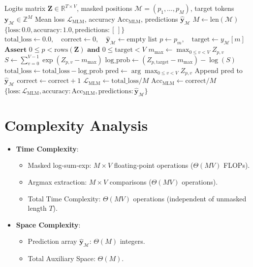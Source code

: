 \documentclass[11pt,a4paper]{article}
\theoremstyle{definition}
\begin{document}
\begin{algorithm}[H]
\caption{Masked Language Modeling Evaluation Pipeline}
\label{alg:mlm}
\begin{algorithmic}[1]
\Require Logits matrix $\mathbf{Z} \in \mathbb{R}^{T \times V}$, masked positions $\mathcal{M} = (p_1, \dots, p_M)$, target tokens $\mathbf{y}_{\mathcal{M}} \in \mathbb{Z}^M$
\Ensure Mean loss $\mathcal{L}_{\text{MLM}}$, accuracy $\text{Acc}_{\text{MLM}}$, predictions $\hat{\mathbf{y}}_{\mathcal{M}}$
\State $M \gets \text{len}(\mathcal{M})$
    \State \Return $\{\text{loss}: 0.0, \text{accuracy}: 1.0, \text{predictions}: [\,]\}$
\EndIf
\State $\text{total\_loss} \gets 0.0, \quad \text{correct} \gets 0, \quad \hat{\mathbf{y}}_{\mathcal{M}} \gets \text{empty list}$
    \State $p \gets p_m, \quad \text{target} \gets y_{\mathcal{M}}[m]$
    \State $\textbf{Assert } 0 \le p < \text{rows}(\mathbf{Z}) \textbf{ and } 0 \le \text{target} < V$
    \State $m_{\text{max}} \gets \max_{0 \le v < V} Z_{p, v}$
    \State $S \gets \sum_{v=0}^{V-1} \exp(Z_{p, v} - m_{\text{max}})$
    \State $\text{log\_prob} \gets (Z_{p, \text{target}} - m_{\text{max}}) - \log(S)$
    \State $\text{total\_loss} \gets \text{total\_loss} - \text{log\_prob}$
    \State $\text{pred} \gets \arg\max_{0 \le v < V} Z_{p, v}$
    \State Append $\text{pred}$ to $\hat{\mathbf{y}}_{\mathcal{M}}$
        \State $\text{correct} \gets \text{correct} + 1$
    \EndIf
\EndFor
\State $\mathcal{L}_{\text{MLM}} \gets \text{total\_loss} / M$
\State $\text{Acc}_{\text{MLM}} \gets \text{correct} / M$
\State \Return $\{\text{loss}: \mathcal{L}_{\text{MLM}}, \text{accuracy}: \text{Acc}_{\text{MLM}}, \text{predictions}: \hat{\mathbf{y}}_{\mathcal{M}}\}$
\end{algorithmic}
\end{algorithm}

\section{Complexity Analysis}
\begin{itemize}
    \item \textbf{Time Complexity}:
    \begin{itemize}
        \item Masked log-sum-exp: $M \times V$ floating-point operations ($\Theta(M V)$ FLOPs).
        \item Argmax extraction: $M \times V$ comparisons ($\Theta(M V)$ operations).
        \item Total Time Complexity: $\Theta(M V)$ operations (independent of unmasked length $T$).
    \end{itemize}
    \item \textbf{Space Complexity}:
    \begin{itemize}
        \item Prediction array $\hat{\mathbf{y}}_{\mathcal{M}}$: $\Theta(M)$ integers.
        \item Total Auxiliary Space: $\Theta(M)$.
    \end{itemize}
\end{itemize}
\end{document}
